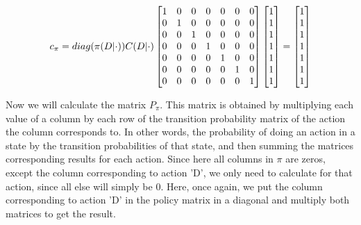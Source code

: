 \documentclass{article}
\begin{document}
\begin{equation}
    \notag
    c_{\pi} = diag(\pi(D|\cdot))C(D|\cdot)
    \begin{bmatrix}
        1 & 0 & 0 & 0 & 0 & 0 & 0 \\
        0 & 1 & 0 & 0 & 0 & 0 & 0 \\
        0 & 0 & 1 & 0 & 0 & 0 & 0 \\
        0 & 0 & 0 & 1 & 0 & 0 & 0 \\
        0 & 0 & 0 & 0 & 1 & 0 & 0 \\
        0 & 0 & 0 & 0 & 0 & 1 & 0 \\
        0 & 0 & 0 & 0 & 0 & 0 & 1 \\
    \end{bmatrix}
    \begin{bmatrix}
        1 \\
        1 \\
        1 \\
        1 \\
        1 \\
        1 \\
        1 \\
    \end{bmatrix}
    = 
    \begin{bmatrix}
        1 \\
        1 \\
        1 \\
        1 \\
        1 \\
        1 \\
        1 \\
    \end{bmatrix}
\end{equation}

\bigskip

Now we will calculate the matrix $P_{\pi}$.
This matrix is obtained by multiplying each value of a column by each row of the transition probability matrix of the action the column corresponds to.
In other words, the probability of doing an action in a state by the transition probabilities of that state, and then summing the matrices corresponding results for each action.
Since here all columns in $\pi$ are zeros, except the column corresponding to action 'D', we only need to calculate for that action, since all else will simply be 0.
Here, once again, we put the column corresponding to action 'D' in the policy matrix in a diagonal and multiply both matrices to get the result.
\end{document}
